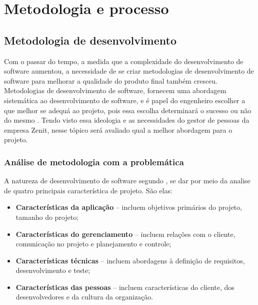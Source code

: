 \chapter[Metodologia e Processo]{Metodologia e processo}
\section{Metodologia de desenvolvimento}
Com o passar do tempo, a medida que a complexidade do desenvolvimento de software aumentou, a necessidade de se criar metodologias de desenvolvimento de software para melhorar a qualidade do produto final também cresceu. Metodologias de desenvolvimento de software, fornecem uma abordagem sistemática ao desenvolvimento de software, e é papel do engenheiro escolher a que melhor se adequá ao projeto, pois essa escolha determinará o sucesso ou não do mesmo \cite{sweebok}. Tendo visto essa ideologia e as necessidades do gestor de pessoas da empresa Zenit, nesse tópico será avaliado qual a melhor abordagem para o projeto.
\subsection{Análise de metodologia com a problemática}
A natureza de desenvolvimento de software segundo \cite{boehm2004}, se dar por meio da analise de quatro principais característica de projeto. São elas:
\begin{itemize}
    \item \textbf{Características da aplicação} – incluem objetivos primários do projeto, tamanho do projeto;
    \item \textbf{Características do gerenciamento} – incluem relações com o cliente, comunicação no projeto e planejamento e controle;
    \item \textbf{Características técnicas} – incluem abordagens à definição de requisitos, desenvolvimento e teste;
    \item \textbf{Características das pessoas} – incluem características do cliente, dos desenvolvedores e da cultura da organização.
\end{itemize}
